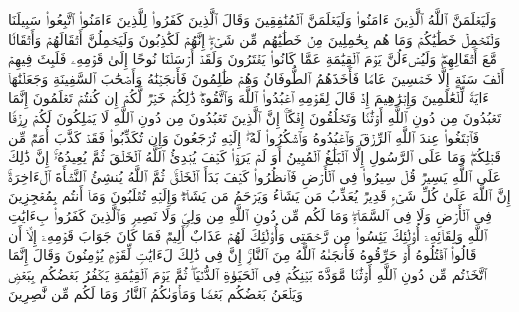 \startbuffer[\q:29:11]
وَلَیَعۡلَمَنَّ ٱللَّهُ ٱلَّذِینَ ءَامَنُوا۟ وَلَیَعۡلَمَنَّ ٱلۡمُنَٰفِقِینَ%
\stopbuffer%
\startbuffer[\q:29:12]
وَقَالَ ٱلَّذِینَ كَفَرُوا۟ لِلَّذِینَ ءَامَنُوا۟ ٱتَّبِعُوا۟ سَبِیلَنَا وَلۡنَحۡمِلۡ خَطَٰیَٰكُمۡ وَمَا هُم بِحَٰمِلِینَ مِنۡ خَطَٰیَٰهُم مِّن شَیۡءٍۖ إِنَّهُمۡ لَكَٰذِبُونَ%
\stopbuffer%
\startbuffer[\q:29:13]
وَلَیَحۡمِلُنَّ أَثۡقَالَهُمۡ وَأَثۡقَالࣰا مَّعَ أَثۡقَالِهِمۡۖ وَلَیُسۡءَلُنَّ یَوۡمَ ٱلۡقِیَٰمَةِ عَمَّا كَانُوا۟ یَفۡتَرُونَ%
\stopbuffer%
\startbuffer[\q:29:14]
وَلَقَدۡ أَرۡسَلۡنَا نُوحًا إِلَىٰ قَوۡمِهِۦ فَلَبِثَ فِیهِمۡ أَلۡفَ سَنَةٍ إِلَّا خَمۡسِینَ عَامࣰا فَأَخَذَهُمُ ٱلطُّوفَانُ وَهُمۡ ظَٰلِمُونَ%
\stopbuffer%
\startbuffer[\q:29:15]
فَأَنجَیۡنَٰهُ وَأَصۡحَٰبَ ٱلسَّفِینَةِ وَجَعَلۡنَٰهَاۤ ءَایَةࣰ لِّلۡعَٰلَمِینَ%
\stopbuffer%
\startbuffer[\q:29:16]
وَإِبۡرَٰهِیمَ إِذۡ قَالَ لِقَوۡمِهِ ٱعۡبُدُوا۟ ٱللَّهَ وَٱتَّقُوهُۖ ذَٰلِكُمۡ خَیۡرࣱ لَّكُمۡ إِن كُنتُمۡ تَعۡلَمُونَ%
\stopbuffer%
\startbuffer[\q:29:17]
إِنَّمَا تَعۡبُدُونَ مِن دُونِ ٱللَّهِ أَوۡثَٰنࣰا وَتَخۡلُقُونَ إِفۡكًاۚ إِنَّ ٱلَّذِینَ تَعۡبُدُونَ مِن دُونِ ٱللَّهِ لَا یَمۡلِكُونَ لَكُمۡ رِزۡقࣰا فَٱبۡتَغُوا۟ عِندَ ٱللَّهِ ٱلرِّزۡقَ وَٱعۡبُدُوهُ وَٱشۡكُرُوا۟ لَهُۥۤۖ إِلَیۡهِ تُرۡجَعُونَ%
\stopbuffer%
\startbuffer[\q:29:18]
وَإِن تُكَذِّبُوا۟ فَقَدۡ كَذَّبَ أُمَمࣱ مِّن قَبۡلِكُمۡۖ وَمَا عَلَى ٱلرَّسُولِ إِلَّا ٱلۡبَلَٰغُ ٱلۡمُبِینُ%
\stopbuffer%
\startbuffer[\q:29:19]
أَوَ لَمۡ یَرَوۡا۟ كَیۡفَ یُبۡدِئُ ٱللَّهُ ٱلۡخَلۡقَ ثُمَّ یُعِیدُهُۥۤۚ إِنَّ ذَٰلِكَ عَلَى ٱللَّهِ یَسِیرࣱ%
\stopbuffer%
\startbuffer[\q:29:20]
قُلۡ سِیرُوا۟ فِی ٱلۡأَرۡضِ فَٱنظُرُوا۟ كَیۡفَ بَدَأَ ٱلۡخَلۡقَۚ ثُمَّ ٱللَّهُ یُنشِئُ ٱلنَّشۡأَةَ ٱلۡءَاخِرَةَۚ إِنَّ ٱللَّهَ عَلَىٰ كُلِّ شَیۡءࣲ قَدِیرࣱ%
\stopbuffer%
\startbuffer[\q:29:21]
یُعَذِّبُ مَن یَشَاۤءُ وَیَرۡحَمُ مَن یَشَاۤءُۖ وَإِلَیۡهِ تُقۡلَبُونَ%
\stopbuffer%
\startbuffer[\q:29:22]
وَمَاۤ أَنتُم بِمُعۡجِزِینَ فِی ٱلۡأَرۡضِ وَلَا فِی ٱلسَّمَاۤءِۖ وَمَا لَكُم مِّن دُونِ ٱللَّهِ مِن وَلِیࣲّ وَلَا نَصِیرࣲ%
\stopbuffer%
\startbuffer[\q:29:23]
وَٱلَّذِینَ كَفَرُوا۟ بِءَایَٰتِ ٱللَّهِ وَلِقَاۤئِهِۦۤ أُو۟لَٰۤئِكَ یَئِسُوا۟ مِن رَّحۡمَتِی وَأُو۟لَٰۤئِكَ لَهُمۡ عَذَابٌ أَلِیمࣱ%
\stopbuffer%
\startbuffer[\q:29:24]
فَمَا كَانَ جَوَابَ قَوۡمِهِۦۤ إِلَّاۤ أَن قَالُوا۟ ٱقۡتُلُوهُ أَوۡ حَرِّقُوهُ فَأَنجَىٰهُ ٱللَّهُ مِنَ ٱلنَّارِۚ إِنَّ فِی ذَٰلِكَ لَءَایَٰتࣲ لِّقَوۡمࣲ یُؤۡمِنُونَ%
\stopbuffer%
\startbuffer[\q:29:25]
وَقَالَ إِنَّمَا ٱتَّخَذۡتُم مِّن دُونِ ٱللَّهِ أَوۡثَٰنࣰا مَّوَدَّةَ بَیۡنِكُمۡ فِی ٱلۡحَیَوٰةِ ٱلدُّنۡیَاۖ ثُمَّ یَوۡمَ ٱلۡقِیَٰمَةِ یَكۡفُرُ بَعۡضُكُم بِبَعۡضࣲ وَیَلۡعَنُ بَعۡضُكُم بَعۡضࣰا وَمَأۡوَىٰكُمُ ٱلنَّارُ وَمَا لَكُم مِّن نَّٰصِرِینَ%
